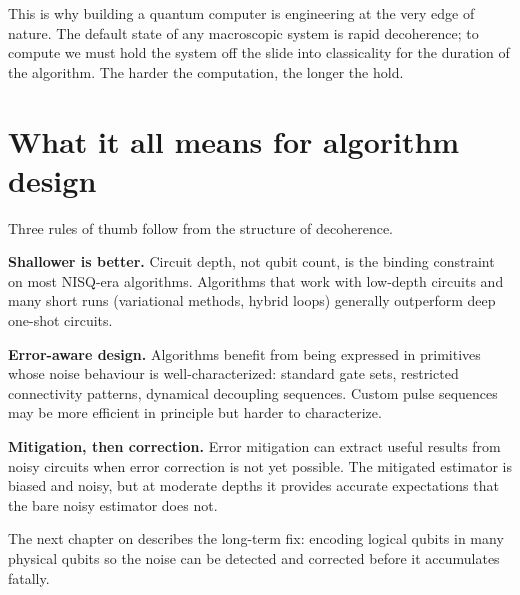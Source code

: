 \begin{remark}
This is why building a quantum computer is engineering at the very edge of nature. The default state of any macroscopic system is rapid decoherence; to compute we must hold the system off the slide into classicality for the duration of the algorithm. The harder the computation, the longer the hold.
\end{remark}

\section{What it all means for algorithm design}

Three rules of thumb follow from the structure of decoherence.

\textbf{Shallower is better.} Circuit depth, not qubit count, is the binding constraint on most NISQ-era algorithms. Algorithms that work with low-depth circuits and many short runs (variational methods, hybrid loops) generally outperform deep one-shot circuits.

\textbf{Error-aware design.} Algorithms benefit from being expressed in primitives whose noise behaviour is well-characterized: standard gate sets, restricted connectivity patterns, dynamical decoupling sequences. Custom pulse sequences may be more efficient in principle but harder to characterize.

\textbf{Mitigation, then correction.} Error mitigation can extract useful results from noisy circuits when error correction is not yet possible. The mitigated estimator is biased and noisy, but at moderate depths it provides accurate expectations that the bare noisy estimator does not.

The next chapter on  describes the long-term fix: encoding logical qubits in many physical qubits so the noise can be detected and corrected before it accumulates fatally.

\textsep
